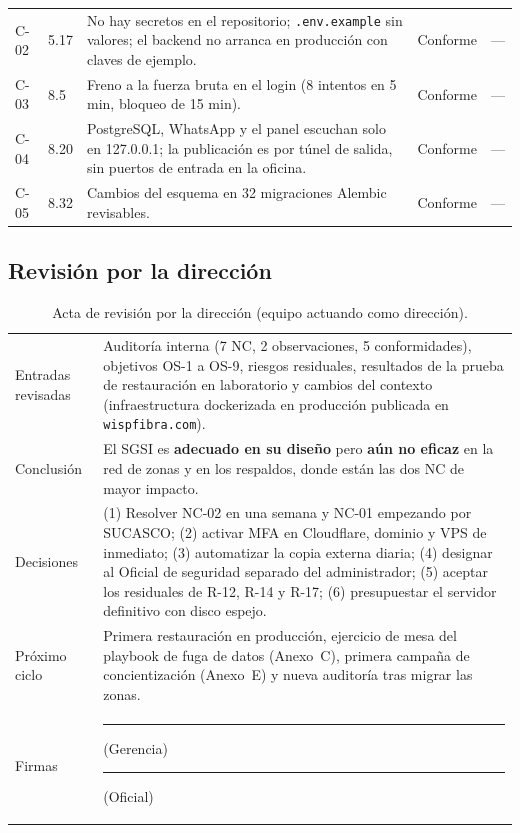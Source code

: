 {\begin{longtable}{L{1.0cm}L{1.0cm}L{6.1cm}L{2.0cm}L{3.1cm}}
C-02 & 5.17 & No hay secretos en el repositorio; \texttt{.env.example} sin valores; el backend no arranca en producción con claves de ejemplo. & Conforme & --- \\
C-03 & 8.5 & Freno a la fuerza bruta en el login (8 intentos en 5 min, bloqueo de 15 min). & Conforme & --- \\
C-04 & 8.20 & PostgreSQL, WhatsApp y el panel escuchan solo en 127.0.0.1; la publicación es por túnel de salida, sin puertos de entrada en la oficina. & Conforme & --- \\
C-05 & 8.32 & Cambios del esquema en 32 migraciones Alembic revisables. & Conforme & --- \\
\end{longtable}
}

\subsection{Revisión por la dirección}

\begin{table}[H]
\centering
\caption{Acta de revisión por la dirección (equipo actuando como dirección).}
\label{tab:ce03-sgsi-revision}
\small
\begin{tabularx}{\textwidth}{L{3.2cm}X}
\toprule
Entradas revisadas & Auditoría interna (7 NC, 2 observaciones, 5 conformidades), objetivos OS-1 a OS-9, riesgos residuales, resultados de la prueba de restauración en laboratorio y cambios del contexto (infraestructura dockerizada en producción publicada en \texttt{wispfibra.com}). \\
Conclusión & El SGSI es \textbf{adecuado en su diseño} pero \textbf{aún no eficaz} en la red de zonas y en los respaldos, donde están las dos NC de mayor impacto. \\
Decisiones & (1) Resolver NC-02 en una semana y NC-01 empezando por SUCASCO; (2) activar MFA en Cloudflare, dominio y VPS de inmediato; (3) automatizar la copia externa diaria; (4) designar al Oficial de seguridad separado del administrador; (5) aceptar los residuales de R-12, R-14 y R-17; (6) presupuestar el servidor definitivo con disco espejo. \\
Próximo ciclo & Primera restauración en producción, ejercicio de mesa del playbook de fuga de datos (Anexo~C), primera campaña de concientización (Anexo~E) y nueva auditoría tras migrar las zonas. \\
Firmas & \rule{5cm}{0.4pt} (Gerencia) \qquad \rule{5cm}{0.4pt} (Oficial) \\
\bottomrule
\end{tabularx}
\end{table}

